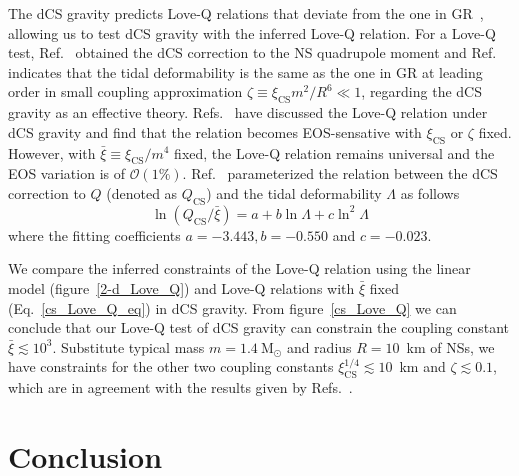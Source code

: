 \documentclass[a4paper,11pt]{article}
\newcommand{\ZW}[1]{\textcolor{magenta}{$\mathcal{ZW}$:~#1}}
\begin{document}
The dCS gravity predicts Love-Q relations that deviate from the one in GR~\cite{Yagi:2013bca,Yagi:2013awa,Gupta:2017vsl}, 
allowing us to test dCS gravity with the inferred Love-Q relation. 
For a Love-Q test, Ref.~\cite{Yagi:2013mbt} obtained the dCS correction to the NS 
quadrupole moment and Ref.~\cite{Yagi:2011xp} indicates that the tidal 
deformability is the same as the one in GR at leading order in small coupling 
approximation $\zeta \equiv \xi_{\mathrm{CS}} m^2/R^6 \ll 1$, regarding the dCS 
gravity as an effective theory. Refs.~\cite{Yagi_2017,Yagi:2013mbt,Gupta:2017vsl} 
have discussed the Love-Q relation under dCS gravity and find that the relation 
becomes EOS-sensative with $\xi_{\mathrm{CS}}$ or $\zeta$ fixed. However, with 
$\bar{\xi}\equiv \xi_{\mathrm{CS}}/m^4$ fixed, the Love-Q relation remains 
universal and the EOS variation is of $\mathcal{O}(1\%)$. Ref.~\cite{Gupta:2017vsl} 
parameterized the relation between the dCS correction to $Q$ (denoted as $Q_{\mathrm{CS}}$) and the tidal deformability $\Lambda$ as follows
\begin{equation}
    \label{cs_Love_Q_eq}
    \ln (Q_{\mathrm{CS}}/\bar{\xi}) = a + b \ln \Lambda + c \ln^{2} \Lambda
\end{equation} 
where the fitting coefficients $a=-3.443, b=-0.550$ and $c=-0.023$. 

We compare the inferred constraints of the Love-Q relation 
using the linear model (figure~\ref{2-d_Love_Q}) and Love-Q 
relations with $\bar{\xi}$ fixed (Eq.~\ref{cs_Love_Q_eq}) in dCS gravity. From 
figure~\ref{cs_Love_Q} we can conclude that our Love-Q test of dCS gravity can 
constrain the coupling constant $\bar{\xi} \lesssim 10^{3}$. Substitute typical 
mass $m=1.4~\mathrm{M_{\odot}}$ and radius $R=10$~km of NSs, we have constraints 
for the other two coupling constants $\xi_{\mathrm{CS}}^{1/4} \lesssim 10$~km and 
$\zeta \lesssim 0.1$, which are in agreement with the results 
given by Refs.~\cite{Yagi:2013bca,Yagi:2013awa}. 

\section{Conclusion}
\label{sec:conclusion}
\end{document}
